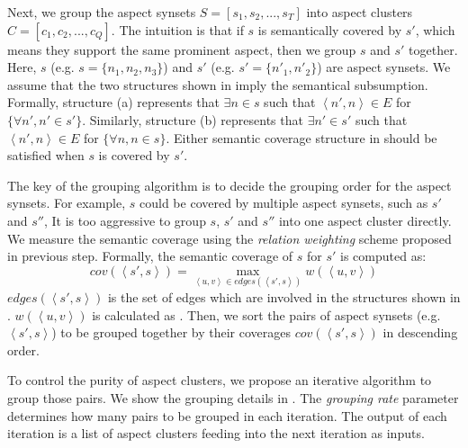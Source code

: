 Next, we group the aspect synsets $S=[s_1, s_2, ..., s_T]$
into aspect clusters $C=[c_1, c_2, ..., c_Q]$.
The intuition is that if $s$ is semantically covered 
by $s'$, 
which means they support the same prominent aspect,
then we group $s$ and $s'$ together.
Here, $s$ (e.g. $s=\{n_1, n_2, n_3\}$) and 
$s'$ (e.g. $s'=\{n'_1, n'_2\}$)
are aspect synsets.
We assume that the two structures 
shown in  imply
the semantical subsumption.
Formally, structure (a) represents that 
$\exists n \in s$ such that
$\left\langle n',n \right\rangle \in E$
for $ \{\forall n', n'\in s'\}$. 
Similarly, structure (b) represents that 
$\exists n' \in s'$ such that
$\left\langle n',n \right\rangle \in E$
for $ \{\forall n, n\in s\}$. 
Either semantic coverage structure 
in  should be
satisfied when $s$ is covered by $s'$.

The key of the grouping algorithm
is to decide the grouping order for the aspect synsets.
For example, $s$ could be covered by multiple 
aspect synsets, such as $s'$ and $s''$, 
It is too aggressive to group 
$s$, $s'$ and $s''$ into one aspect cluster directly.
We measure the semantic coverage using the 
\textit{relation weighting} scheme proposed in previous step.
Formally, the semantic coverage of $s$ for $s'$ is
computed as: 
\begin{equation}
	cov(\left\langle s',s\right\rangle)=\displaystyle\max_{\left\langle u,v\right\rangle \in edges(\left\langle s',s\right\rangle)} w(\left\langle u,v\right\rangle)
	\label{eq:coverage}
\end{equation}
$edges(\left\langle s',s\right\rangle)$ is the set of edges
which are involved in the structures shown in .
$w(\left\langle u,v\right\rangle)$ is calculated as .
Then, we sort the pairs of aspect synsets (e.g. $\left\langle s',s\right\rangle$) 
to be grouped together by their coverages $cov(\left\langle s',s\right\rangle)$ in descending order.

To control the purity of aspect clusters,
we propose an iterative algorithm to group those pairs.
We show the grouping details in .
The \textit{grouping rate} parameter determines how many
pairs to be grouped in each iteration.
The output of each iteration is a list of aspect clusters
feeding into the next iteration as inputs.

